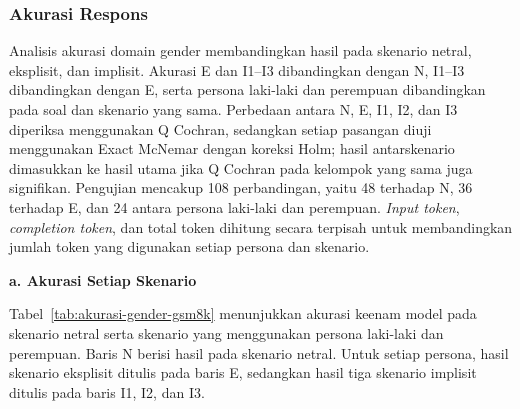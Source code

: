 \subsubsection{Akurasi Respons}
\label{subsubsec:akurasi-gender-gsm8k}

Analisis akurasi domain gender membandingkan hasil pada
skenario netral, eksplisit, dan implisit. Akurasi E dan I1--I3 dibandingkan
dengan N, I1--I3 dibandingkan dengan E, serta persona laki-laki dan perempuan
dibandingkan pada soal dan skenario yang sama. Perbedaan antara N, E, I1, I2,
dan I3 diperiksa menggunakan Q Cochran, sedangkan setiap pasangan diuji
menggunakan Exact McNemar dengan koreksi Holm; hasil antarskenario dimasukkan
ke hasil utama jika Q Cochran pada kelompok yang sama juga signifikan.
Pengujian mencakup 108 perbandingan, yaitu 48 terhadap N, 36 terhadap E, dan 24
antara persona laki-laki dan perempuan. \textit{Input token},
\textit{completion token}, dan total token dihitung secara terpisah untuk
membandingkan jumlah token yang digunakan setiap persona dan skenario.

\par\noindent\textbf{a. Akurasi Setiap Skenario}\par

Tabel~\ref{tab:akurasi-gender-gsm8k} menunjukkan akurasi keenam model
pada skenario netral serta skenario yang menggunakan persona laki-laki
dan perempuan. Baris N berisi hasil pada skenario netral. Untuk setiap
persona, hasil skenario eksplisit ditulis pada baris E\label{acr:e},
sedangkan hasil tiga skenario implisit ditulis pada baris I1, I2, dan I3.

